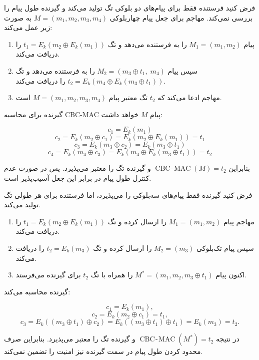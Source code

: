 
فرض کنید فرستنده فقط برای پیام‌های دو بلوکی تگ تولید می‌کند و گیرنده طول پیام را بررسی نمی‌کند.  
مهاجم برای جعل پیام چهاربلوکی
\(
M=(m_1,m_2,m_3,m_4)
\)
به صورت زیر عمل می‌کند:

\begin{enumerate}
    \item پیام
    \(
    M_1=(m_1,m_2)
    \)
    را به فرستنده می‌دهد و تگ
    \(
    t_1=E_k\!\left(m_2 \oplus E_k(m_1)\right)
    \)
    را دریافت می‌کند.

    \item سپس پیام
    \(
    M_2=(m_3\oplus t_1,\; m_4)
    \)
    را به فرستنده می‌دهد و تگ
    \(
    t_2
    =E_k\!\left(m_4 \oplus E_k(m_3\oplus t_1)\right)
    \)
    را دریافت می‌کند.

    \item مهاجم ادعا می‌کند که \(t_2\) تگ معتبر پیام
    \(
    M=(m_1,m_2,m_3,m_4)
    \)
    است.
\end{enumerate}

گیرنده برای محاسبه CBC-MAC پیام \(M\) خواهد داشت:

\[
c_1=E_k(m_1) 
\]
\[
c_2=E_k(m_2\oplus c_1)
    =E_k(m_2\oplus E_k(m_1))
    =t_1
\]
\[
c_3=E_k(m_3\oplus c_2)
    =E_k(m_3\oplus t_1)
\]
\[
c_4=E_k(m_4\oplus c_3)
    =E_k\!\left(m_4\oplus E_k(m_3\oplus t_1)\right)
    =t_2
\]

بنابراین
\(
\operatorname{CBC\!-\!MAC}(M)=t_2
\)
و گیرنده تگ را معتبر می‌پذیرد. پس  در صورت عدم کنترل طول پیام در برابر این جعل آسیب‌پذیر است.


فرض کنید گیرنده فقط پیام‌های سه‌بلوکی را می‌پذیرد، اما فرستنده برای هر طولی تگ تولید می‌کند.

\begin{enumerate}
    \item مهاجم پیام
    \(
    M_1=(m_1,m_2)
    \)
    را ارسال کرده و تگ
    \( 
    t_1=E_k\!\left(m_2\oplus E_k(m_1)\right)
    \)
    را دریافت می‌کند.

    \item سپس پیام تک‌بلوکی
    \(
    M_2=(m_3)
    \)
    را ارسال کرده و تگ
    \(
    t_2=E_k(m_3)
    \)
    را دریافت می‌کند.

    \item اکنون پیام
    \(
    M^*=(m_1,m_2,m_3\oplus t_1)
    \)
    را همراه با تگ \(t_2\) برای گیرنده می‌فرستد.
\end{enumerate}

گیرنده محاسبه می‌کند:

\[
c_1=E_k(m_1),
\]
\[
c_2=E_k(m_2\oplus c_1)
    =t_1,
\]
\[
c_3
=E_k\!\left((m_3\oplus t_1)\oplus c_2\right)
=E_k\!\left((m_3\oplus t_1)\oplus t_1\right)
=E_k(m_3)
=t_2.
\]

در نتیجه
\(
\operatorname{CBC\!-\!MAC}(M^*)=t_2
\)
و گیرنده تگ را معتبر می‌پذیرد. بنابراین صرف محدود کردن طول پیام در سمت گیرنده نیز امنیت  را تضمین نمی‌کند.